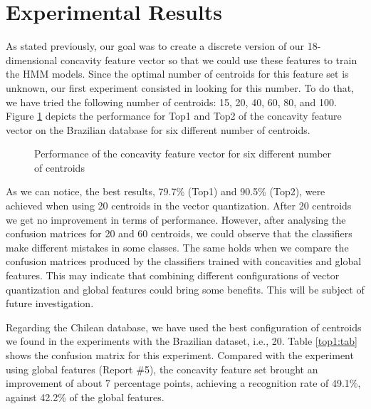 \documentclass{article}[14pt, oneside, a4paper, times]
\begin{document}
\section{Experimental Results}

As stated previously, our goal was to create a discrete version of our 18-dimensional concavity feature vector so that we could use these features to train the HMM models. Since the optimal number of centroids for this feature set is unknown, our first experiment consisted in looking for this number. To do that, we have tried the following number of centroids: 15, 20, 40, 60, 80, and 100. Figure \ref{vq:fig} depicts the performance for Top1 and Top2 of the concavity feature vector on the Brazilian database for six different number of centroids.

\begin{figure}[htbp]
   \centering
   \caption{Performance of the concavity feature vector for six different number of centroids}
  \label{vq:fig}
\end{figure}
 
As we can notice, the best results, 79.7\% (Top1) and 90.5\% (Top2), were achieved when using 20 centroids in the vector quantization. After 20 centroids we get no improvement in terms of performance. However, after analysing the confusion matrices for 20 and 60 centroids, we could observe that the classifiers make different mistakes in some classes. The same holds when we compare the confusion matrices produced by the classifiers trained with concavities and global features. This may indicate that combining different configurations of vector quantization and global features could bring some benefits. This will be subject of future investigation. 

Regarding the Chilean database, we have used the best configuration of centroids we found in the experiments with the Brazilian dataset, i.e., 20. Table \ref{top1:tab} shows the confusion matrix for this experiment. Compared with the experiment using global features (Report \#5), the concavity feature set brought an improvement of about 7 percentage points, achieving a recognition rate of 49.1\%, against 42.2\% of the global features. 
\end{document}

